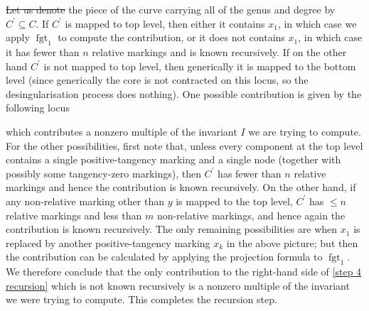 \documentclass[11pt]{amsart}
\newcommand{\fgt}{\operatorname{fgt}}
\theoremstyle{definition}
\theoremstyle{definition}
\providecommand{\DIFaddtex}[1]{{\protect\color{blue}\uwave{#1}}} %
\providecommand{\DIFdeltex}[1]{{\protect\color{red}\sout{#1}}}                      %
\providecommand{\DIFaddbegin}{} %
\providecommand{\DIFaddend}{} %
\providecommand{\DIFdelbegin}{} %
\providecommand{\DIFdelend}{} %
\providecommand{\DIFadd}[1]{\texorpdfstring{\DIFaddtex{#1}}{#1}} %
\providecommand{\DIFdel}[1]{\texorpdfstring{\DIFdeltex{#1}}{}} %
\begin{document}
\DIFdelbegin \DIFdel{Let us denote }\DIFdelend \DIFaddbegin \DIFadd{Denote }\DIFaddend the piece of the curve carrying all of the genus and degree by $C^\prime\subseteq C$. If $C^\prime$ is mapped to top level, then either it contains $x_1$, in which case we apply $\fgt_1$ to compute the contribution, or it does not contains $x_1$, in which case it has fewer than $n$ relative markings and is known recursively.  If on the other hand $C^\prime$ is not mapped to top level, then generically it is mapped to the bottom level (since generically the core is not contracted on this locus, so the desingularisation process does nothing). One possible contribution is given by the following locus
\begin{center}
\end{center}
which contributes a nonzero multiple of the invariant $I$ we are trying to compute. For the other possibilities, first note that, unless every component at the top level contains a single positive-tangency marking and a single node (together with possibly some tangency-zero markings), then $C^\prime$ has fewer than $n$ relative markings and hence the contribution is known recursively. On the other hand, if any non-relative marking other than $y$ is mapped to the top level, $C^\prime$ has $\leq n$ relative markings and less than $m$ non-relative markings, and hence again the contribution is known recursively. The only remaining possibilities are when $x_1$ is replaced by another positive-tangency marking $x_k$ in the above picture; but then the contribution can be calculated by applying the projection formula to $\fgt_{1}$. We therefore conclude that the only contribution to the right-hand side of \eqref{step 4 recursion} which is not known recursively is a nonzero multiple of the invariant we were trying to compute. This completes the recursion step.
\end{document}
